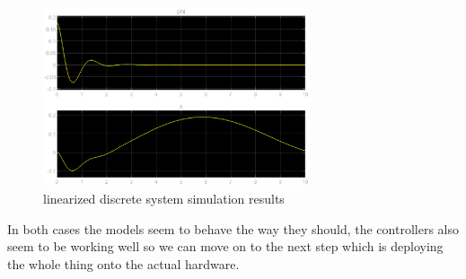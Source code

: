 \begin{figure}[H]
		\centering
		\includegraphics[width=0.7\textwidth]{figures/linear_balan_bot_disc_sim.eps}
		\caption{linearized discrete system simulation results}
		\label{fig:lin_disc_res}
\end{figure}

In both cases the models seem to behave the way they should, the controllers also seem to be working well so we can move on to the next step which is deploying the whole thing onto the actual hardware.




